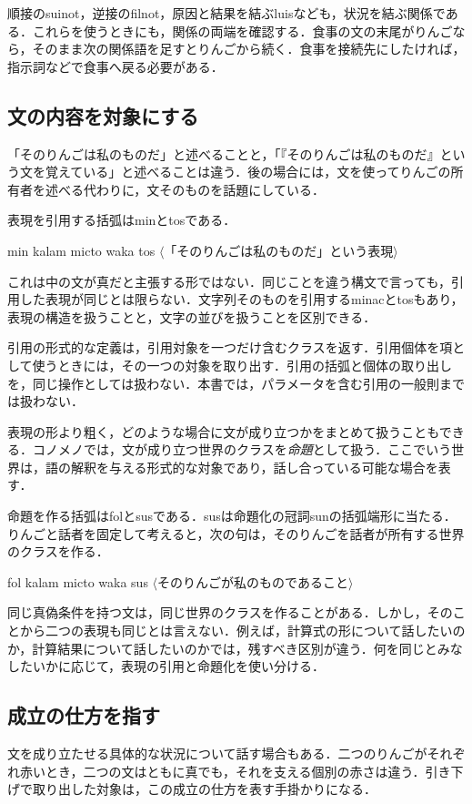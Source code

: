 \documentclass[b5paper, 10pt]{ltjsarticle}
\newcommand{\ko}[1]{\textsf{#1}}
\newcommand{\sentence}[1]{$\langle$#1$\rangle$}
\begin{document}
順接の\ko{suinot}，逆接の\ko{filnot}，原因と結果を結ぶ\ko{luis}なども，状況を結ぶ関係である．これらを使うときにも，関係の両端を確認する．食事の文の末尾がりんごなら，そのまま次の関係語を足すとりんごから続く．食事を接続先にしたければ，指示詞などで食事へ戻る必要がある．

\subsection{文の内容を対象にする}
「そのりんごは私のものだ」と述べることと，「『そのりんごは私のものだ』という文を覚えている」と述べることは違う．後の場合には，文を使ってりんごの所有者を述べる代わりに，文そのものを話題にしている．

表現を引用する括弧は\ko{min}と\ko{tos}である．
\begin{exe}
    \ex \ko{min kalam micto waka tos}
    \glt \sentence{「そのりんごは私のものだ」という表現}
\end{exe}
これは中の文が真だと主張する形ではない．同じことを違う構文で言っても，引用した表現が同じとは限らない．文字列そのものを引用する\ko{minac}と\ko{tos}もあり，表現の構造を扱うことと，文字の並びを扱うことを区別できる．

\begin{remark}
    引用の形式的な定義は，引用対象を一つだけ含むクラスを返す．引用個体を項として使うときには，その一つの対象を取り出す．引用の括弧と個体の取り出しを，同じ操作としては扱わない．本書では，パラメータを含む引用の一般則までは扱わない．
\end{remark}

表現の形より粗く，どのような場合に文が成り立つかをまとめて扱うこともできる．コノメノでは，文が成り立つ世界のクラスを\emph{命題}として扱う．ここでいう世界は，語の解釈を与える形式的な対象であり，話し合っている可能な場合を表す．

命題を作る括弧は\ko{fol}と\ko{sus}である．\ko{sus}は命題化の冠詞\ko{sun}の括弧端形に当たる．りんごと話者を固定して考えると，次の句は，そのりんごを話者が所有する世界のクラスを作る．
\begin{exe}
    \ex \ko{fol kalam micto waka sus}
    \glt \sentence{そのりんごが私のものであること}
\end{exe}
同じ真偽条件を持つ文は，同じ世界のクラスを作ることがある．しかし，そのことから二つの表現も同じとは言えない．例えば，計算式の形について話したいのか，計算結果について話したいのかでは，残すべき区別が違う．何を同じとみなしたいかに応じて，表現の引用と命題化を使い分ける．

\subsection{成立の仕方を指す}
文を成り立たせる具体的な状況について話す場合もある．二つのりんごがそれぞれ赤いとき，二つの文はともに真でも，それを支える個別の赤さは違う．引き下げで取り出した対象は，この成立の仕方を表す手掛かりになる．
\end{document}
